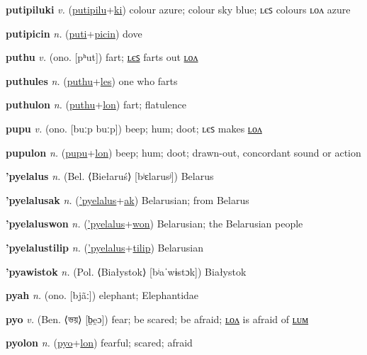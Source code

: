 \textbf{\hypertarget{putipiluki}{putipiluki}} \textit{v.} (\hyperlink{putipilu}{putipilu}+\allowbreak \hyperlink{ki}{ki})
colour azure; colour sky blue; ʟєꜱ colours ʟᴏᴧ azure

\textbf{\hypertarget{putipicin}{putipicin}} \textit{n.} (\hyperlink{puti}{puti}+\allowbreak \hyperlink{picin}{picin})
dove

\textbf{\hypertarget{puthu}{puthu}} \textit{v.} (ono. [pʰut])
fart; \hyperlink{puthules}{ʟєꜱ} farts out \hyperlink{puthulon}{ʟᴏᴧ}

\textbf{\hypertarget{puthules}{puthules}} \textit{n.} (\hyperlink{puthu}{puthu}+\allowbreak \hyperlink{les}{les})
one who farts

\textbf{\hypertarget{puthulon}{puthulon}} \textit{n.} (\hyperlink{puthu}{puthu}+\allowbreak \hyperlink{lon}{lon})
fart; flatulence

\textbf{\hypertarget{pupu}{pupu}} \textit{v.} (ono. [buːp buːp])
beep; hum; doot; ʟєꜱ makes \hyperlink{pupulon}{ʟᴏᴧ}

\textbf{\hypertarget{pupulon}{pupulon}} \textit{n.} (\hyperlink{pupu}{pupu}+\allowbreak \hyperlink{lon}{lon})
beep; hum; doot; drawn-out, concordant sound or action

\textbf{\hypertarget{'pyelalus}{'pyelalus}} \textit{n.} (Bel. ⟨Biełaruś⟩ [bʲɛlarusʲ])
Belarus

\textbf{\hypertarget{'pyelalusak}{'pyelalusak}} \textit{n.} (\hyperlink{'pyelalus}{'pyelalus}+\allowbreak \hyperlink{ak}{ak})
Belarusian; from Belarus

\textbf{\hypertarget{'pyelaluswon}{'pyelaluswon}} \textit{n.} (\hyperlink{'pyelalus}{'pyelalus}+\allowbreak \hyperlink{won}{won})
Belarusian; the Belarusian people

\textbf{\hypertarget{'pyelalustilip}{'pyelalustilip}} \textit{n.} (\hyperlink{'pyelalus}{'pyelalus}+\allowbreak \hyperlink{tilip}{tilip})
Belarusian

\textbf{\hypertarget{'pyawistok}{'pyawistok}} \textit{n.} (Pol. ⟨Białystok⟩ [bʲaˈwɨstɔk])
Białystok

\textbf{\hypertarget{pyah}{pyah}} \textit{n.} (ono. [bjãː])
elephant; Elephantidae

\textbf{\hypertarget{pyo}{pyo}} \textit{v.} (Ben. ⟨{\bengali{}ভয়}⟩ [b̤e̯ɔ])
fear; be scared; be afraid; \hyperlink{pyolon}{ʟᴏᴧ} is afraid of \hyperlink{pyolum}{ʟᴜᴍ}

\textbf{\hypertarget{pyolon}{pyolon}} \textit{n.} (\hyperlink{pyo}{pyo}+\allowbreak \hyperlink{lon}{lon})
fearful; scared; afraid

